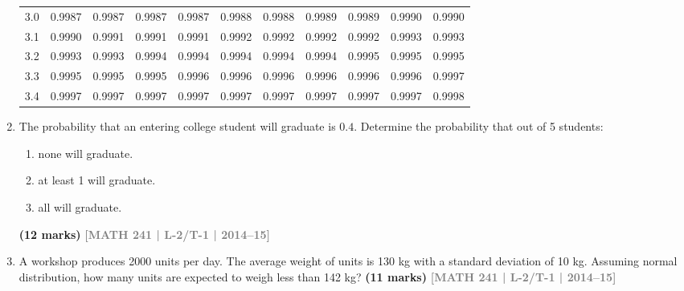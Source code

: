 \documentclass[12pt,a4paper]{article}
\newcommand{\yr}[1]{\hfill\textcolor{gray}{\small\textbf{[#1]}}}
\newcommand{\mk}[1]{\textcolor{orange!70!black}{\small\textbf{(#1 marks)}}}
\begin{document}
\begin{enumerate}
\begin{center}
\begin{longtable}{ccccccccccc}
3.0 & 0.9987 & 0.9987 & 0.9987 & 0.9987 & 0.9988 & 0.9988 & 0.9989 & 0.9989 & 0.9990 & 0.9990 \\
3.1 & 0.9990 & 0.9991 & 0.9991 & 0.9991 & 0.9992 & 0.9992 & 0.9992 & 0.9992 & 0.9993 & 0.9993 \\
3.2 & 0.9993 & 0.9993 & 0.9994 & 0.9994 & 0.9994 & 0.9994 & 0.9994 & 0.9995 & 0.9995 & 0.9995 \\
3.3 & 0.9995 & 0.9995 & 0.9995 & 0.9996 & 0.9996 & 0.9996 & 0.9996 & 0.9996 & 0.9996 & 0.9997 \\
3.4 & 0.9997 & 0.9997 & 0.9997 & 0.9997 & 0.9997 & 0.9997 & 0.9997 & 0.9997 & 0.9997 & 0.9998 \\
\end{longtable}
\end{center}

\item The probability that an entering college student will graduate is $0.4$. Determine the probability that out of 5 students:
\begin{enumerate}
  \item none will graduate.
  \item at least 1 will graduate.
  \item all will graduate.
\end{enumerate}
\mk{12} \yr{MATH 241 | L-2/T-1 | 2014--15}

\item A workshop produces 2000 units per day. The average weight of units is 130 kg with a standard deviation of 10 kg. Assuming normal distribution, how many units are expected to weigh less than 142 kg?
\mk{11} \yr{MATH 241 | L-2/T-1 | 2014--15}

\begin{center}
\end{center}
\end{enumerate}
\end{document}
